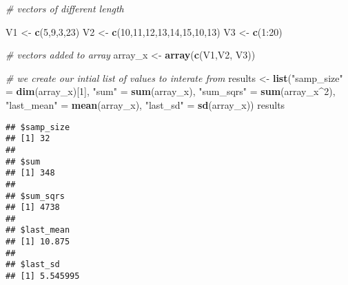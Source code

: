 \documentclass[]{article}
\newenvironment{Shaded}{\begin{snugshade}}{\end{snugshade}}
\newcommand{\KeywordTok}[1]{\textcolor[rgb]{0.13,0.29,0.53}{\textbf{{#1}}}}
\newcommand{\DecValTok}[1]{\textcolor[rgb]{0.00,0.00,0.81}{{#1}}}
\newcommand{\StringTok}[1]{\textcolor[rgb]{0.31,0.60,0.02}{{#1}}}
\newcommand{\CommentTok}[1]{\textcolor[rgb]{0.56,0.35,0.01}{\textit{{#1}}}}
\newcommand{\NormalTok}[1]{{#1}}
\begin{document}
\begin{Shaded}
\begin{Highlighting}[]
\CommentTok{# vectors of different length}

\NormalTok{V1 <-}\StringTok{ }\KeywordTok{c}\NormalTok{(}\DecValTok{5}\NormalTok{,}\DecValTok{9}\NormalTok{,}\DecValTok{3}\NormalTok{,}\DecValTok{23}\NormalTok{)}
\NormalTok{V2 <-}\StringTok{ }\KeywordTok{c}\NormalTok{(}\DecValTok{10}\NormalTok{,}\DecValTok{11}\NormalTok{,}\DecValTok{12}\NormalTok{,}\DecValTok{13}\NormalTok{,}\DecValTok{14}\NormalTok{,}\DecValTok{15}\NormalTok{,}\DecValTok{10}\NormalTok{,}\DecValTok{13}\NormalTok{)}
\NormalTok{V3 <-}\StringTok{ }\KeywordTok{c}\NormalTok{(}\DecValTok{1}\NormalTok{:}\DecValTok{20}\NormalTok{)}

\CommentTok{# vectors added to array}
\NormalTok{array_x <-}\StringTok{ }\KeywordTok{array}\NormalTok{(}\KeywordTok{c}\NormalTok{(V1,V2, V3))}

\CommentTok{# we create our intial list of values to interate from}
\NormalTok{results <-}\StringTok{ }\KeywordTok{list}\NormalTok{(}\StringTok{"samp_size"} \NormalTok{=}\StringTok{ }\KeywordTok{dim}\NormalTok{(array_x)[}\DecValTok{1}\NormalTok{], }
                \StringTok{"sum"} \NormalTok{=}\StringTok{ }\KeywordTok{sum}\NormalTok{(array_x), }
                \StringTok{"sum_sqrs"} \NormalTok{=}\StringTok{ }\KeywordTok{sum}\NormalTok{(array_x^}\DecValTok{2}\NormalTok{), }
                \StringTok{"last_mean"} \NormalTok{=}\StringTok{ }\KeywordTok{mean}\NormalTok{(array_x),}
                \StringTok{"last_sd"} \NormalTok{=}\StringTok{ }\KeywordTok{sd}\NormalTok{(array_x))}
\NormalTok{results}
\end{Highlighting}
\end{Shaded}

\begin{verbatim}
## $samp_size
## [1] 32
## 
## $sum
## [1] 348
## 
## $sum_sqrs
## [1] 4738
## 
## $last_mean
## [1] 10.875
## 
## $last_sd
## [1] 5.545995
\end{verbatim}
\end{document}
